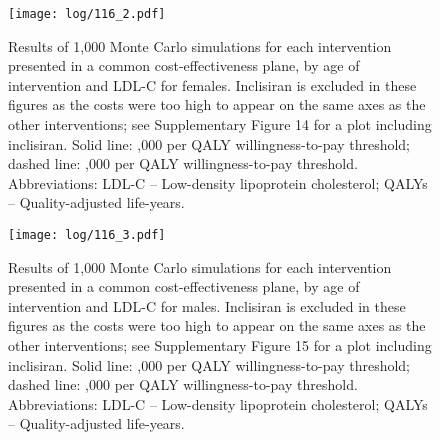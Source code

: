\documentclass[11pt]{article}
\begin{document}
\begin{figure}
    \centering
    \texttt{[image: log/116\_2.pdf]}
    \caption{Results of 1,000 Monte Carlo simulations for each intervention presented in a common cost-effectiveness plane, by age of intervention and LDL-C for females. Inclisiran is excluded in these figures as the costs were too high to appear on the same axes as the other interventions; see Supplementary Figure 14 for a plot including inclisiran. Solid line: ,000 per QALY willingness-to-pay threshold; dashed line: ,000 per QALY willingness-to-pay threshold. Abbreviations: LDL-C -- Low-density lipoprotein cholesterol; QALYs -- Quality-adjusted life-years.}
    \label{Scatter0sexldl0}
\end{figure}
\begin{figure}
    \centering
    \texttt{[image: log/116\_3.pdf]}
    \caption{Results of 1,000 Monte Carlo simulations for each intervention presented in a common cost-effectiveness plane, by age of intervention and LDL-C for males. Inclisiran is excluded in these figures as the costs were too high to appear on the same axes as the other interventions; see Supplementary Figure 15 for a plot including inclisiran. Solid line: ,000 per QALY willingness-to-pay threshold; dashed line: ,000 per QALY willingness-to-pay threshold. Abbreviations: LDL-C -- Low-density lipoprotein cholesterol; QALYs -- Quality-adjusted life-years.}
    \label{Scatter0sexldl1}
\end{figure}
\end{document}
